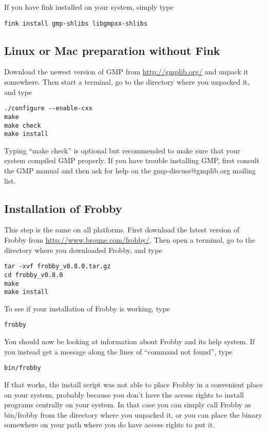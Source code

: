 \documentclass{amsart}
\theoremstyle{definition}
\begin{document}
If you have fink installed on your system, simply type

\begin{verbatim}
fink install gmp-shlibs libgmpxx-shlibs
\end{verbatim}

\subsection{Linux or Mac preparation without Fink}

Download the newest version of GMP from \url{http://gmplib.org/} and
unpack it somewhere. Then start a terminal, go to the directory where
you unpacked it, and type

\begin{verbatim}
./configure --enable-cxx
make
make check
make install
\end{verbatim}

Typing ``make check'' is optional but recommended to make sure that
your system compiled GMP properly. If you have trouble installing GMP,
first consult the GMP manual and then ask for help on the
gmp-discuss@gmplib.org mailing list.

\subsection{Installation of Frobby}

This step is the same on all platforms. First download the latest
version of Frobby from \url{http://www.broune.com/frobby/}. Then open
a terminal, go to the directory where you downloaded Frobby, and type
\begin{verbatim}
tar -xvf frobby_v0.8.0.tar.gz
cd frobby_v0.8.0
make
make install
\end{verbatim}

To see if your installation of Frobby is working, type
\begin{verbatim}
frobby
\end{verbatim}
You should now be looking at information about Frobby and its help
system. If you instead get a message along the lines of ``command not
found'', type
\begin{verbatim}
bin/frobby
\end{verbatim}
If that works, the install script was not able to place Frobby in a
convenient place on your system, probably because you don't have the
access rights to install programs centrally on your system. In that
case you can simply call Frobby as bin/frobby from the directory where
you unpacked it, or you can place the binary somewhere on your path
where you do have access rights to put it.
\end{document}
